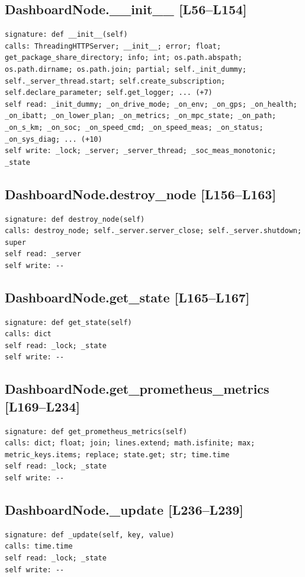 \documentclass[a4paper,10pt,oneside]{book}
\begin{document}
\subsection*{DashboardNode.\_\_init\_\_ [L56--L154]}
\begin{lstlisting}[numbers=none]
signature: def __init__(self)
calls: ThreadingHTTPServer; __init__; error; float; get_package_share_directory; info; int; os.path.abspath; os.path.dirname; os.path.join; partial; self._init_dummy; self._server_thread.start; self.create_subscription; self.declare_parameter; self.get_logger; ... (+7)
self read: _init_dummy; _on_drive_mode; _on_env; _on_gps; _on_health; _on_ibatt; _on_lower_plan; _on_metrics; _on_mpc_state; _on_path; _on_s_km; _on_soc; _on_speed_cmd; _on_speed_meas; _on_status; _on_sys_diag; ... (+10)
self write: _lock; _server; _server_thread; _soc_meas_monotonic; _state
\end{lstlisting}
\subsection*{DashboardNode.destroy\_node [L156--L163]}
\begin{lstlisting}[numbers=none]
signature: def destroy_node(self)
calls: destroy_node; self._server.server_close; self._server.shutdown; super
self read: _server
self write: --
\end{lstlisting}
\subsection*{DashboardNode.get\_state [L165--L167]}
\begin{lstlisting}[numbers=none]
signature: def get_state(self)
calls: dict
self read: _lock; _state
self write: --
\end{lstlisting}
\subsection*{DashboardNode.get\_prometheus\_metrics [L169--L234]}
\begin{lstlisting}[numbers=none]
signature: def get_prometheus_metrics(self)
calls: dict; float; join; lines.extend; math.isfinite; max; metric_keys.items; replace; state.get; str; time.time
self read: _lock; _state
self write: --
\end{lstlisting}
\subsection*{DashboardNode.\_update [L236--L239]}
\begin{lstlisting}[numbers=none]
signature: def _update(self, key, value)
calls: time.time
self read: _lock; _state
self write: --
\end{lstlisting}
\end{document}
